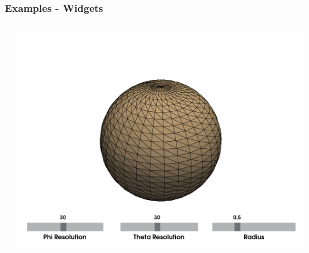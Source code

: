 \documentclass[t]{beamer}
\begin{document}
\begin{frame}
  \frametitle{Examples - Widgets}

  \begin{center}
    \begin{columns}[T]
      \begin{column}{.5\textwidth}
        \inputminted[fontsize=\footnotesize]{python}{code/widgets_ex.py}
      \end{column}

      \begin{column}{.5\textwidth}
        \vspace{-25pt}
        \centering
        \includegraphics[width=1.0\textwidth]{figures/sphx_glr_d_multi-slider-widget_001}
      \end{column}
    \end{columns}
  \end{center}

\end{frame}

\end{document}
